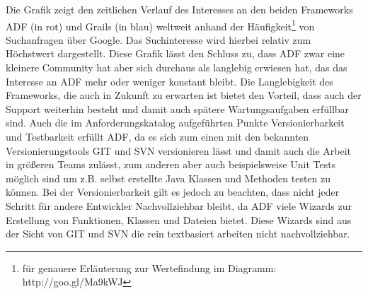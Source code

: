 Die Grafik zeigt den zeitlichen Verlauf des Interesses an den beiden Frameworks ADF (in rot) und Grails (in blau) weltweit anhand der Häufigkeit\footnote{für genauere Erläuterung zur Wertefindung im Diagramm: http://goo.gl/Ma9kWJ} von Suchanfragen über Google. Das Suchinteresse wird hierbei relativ zum Höchstwert dargestellt. Diese Grafik lässt den Schluss zu, dass ADF zwar eine kleinere Community hat aber sich durchaus als langlebig erwiesen hat, das das Interesse an ADF mehr oder weniger konstant bleibt. Die Langlebigkeit des Frameworks, die auch in Zukunft zu erwarten ist bietet den Vorteil, dass auch der Support weiterhin besteht und damit auch spätere Wartungsaufgaben erfüllbar sind. Auch die im Anforderungskatalog aufgeführten Punkte Versionierbarkeit und Testbarkeit erfüllt ADF, da es sich zum einen mit den bekannten Versionierungstools GIT und SVN versionieren lässt und damit auch die Arbeit in größeren Teams zulässt, zum anderen aber auch beispielsweise Unit Tests möglich sind um z.B. selbst erstellte Java Klassen und Methoden testen zu können. Bei der Versionierbarkeit gilt es jedoch zu beachten, dass nicht jeder Schritt für andere Entwickler Nachvollziehbar bleibt, da ADF viele Wizards zur Erstellung von Funktionen, Klassen und Dateien bietet. Diese Wizards sind aus der Sicht von GIT und SVN die rein textbasiert arbeiten nicht nachvollziehbar.

